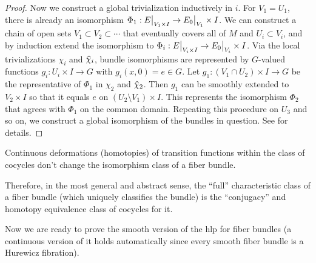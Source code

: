 \begin{proof}
    Now we construct a global trivialization inductively in $i$. For $V_1=U_1$, there is already an isomorphism $\Phi_1:\restr{E}{V_1\times I}\to\restr{E_0}{V_1}\times I$. We can construct a chain of open sets $V_1\subset V_2\subset\cdots$ that eventually covers all of $M$ and $U_i\subset V_i$, and by induction extend the isomorphism to $\Phi_i:\restr{E}{V_i\times I}\to\restr{E_0}{V_i}\times I$. Via the local trivializations $\chi_i$ and $\wh{\chi}_i$, bundle isomorphisms are represented by $G$-valued functions $g_i:U_{i}\times I\to G$ with $g_i(x,0)=e\in G$. Let $g_1:(V_1\cap U_2)\times I\to G$ be the representative of $\Phi_1$ in $\chi_2$ and $\wh{\chi}_2$. Then $g_1$ can be smoothly extended to $V_2\times I$ so that it equals $e$ on $(U_2\setminus V_1)\times I$. This represents the isomorphism $\Phi_2$ that agrees with $\Phi_1$ on the common domain. Repeating this procedure on $U_3$ and so on, we construct a global isomorphism of the bundles in question. See \cite[Thm.~3.3.1]{RS2} for details.
\end{proof}

\begin{cor}
    Continuous deformations (homotopies) of transition functions within the class of cocycles don't change the isomorphism class of a fiber bundle.
\end{cor}



Therefore, in the most general and abstract sense, the ``full'' characteristic class of a fiber bundle (which uniquely classifies the bundle) is the ``conjugacy'' and homotopy equivalence class of cocycles for it.

Now we are ready to prove the smooth version of the \gls{hlp} for fiber bundles (a continuous version of it holds automatically since every smooth fiber bundle is a Hurewicz fibration).


